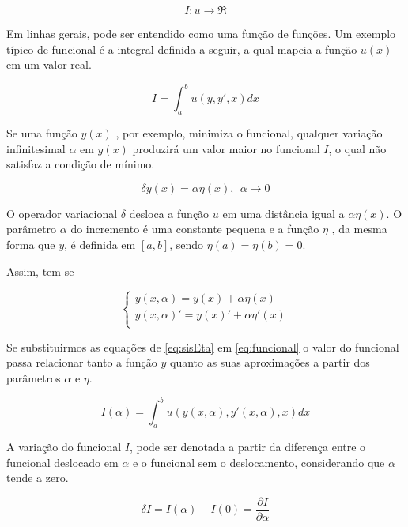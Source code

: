 \begin{equation}
I : u \rightarrow \Re
\end{equation}

Em linhas gerais, pode ser entendido como uma função de funções. Um exemplo típico de funcional é a integral definida a seguir, a qual mapeia a função $ u(x) $ em um valor real.

\begin{equation}
\label{eq:funcional}
I = \int_{a}^{b} u(y, y', x) dx
\end{equation}

Se uma função $ y(x) $ , por exemplo, minimiza o funcional, qualquer variação infinitesimal $ \alpha $ em $ y(x) $ produzirá um valor maior no funcional $ I $, o qual não satisfaz a condição de mínimo.

\begin{equation}
\delta y(x) = \alpha \eta(x), \ \  \alpha \rightarrow 0
\end{equation}

O operador variacional $ \delta $ desloca a função $ u $ em uma distância igual a $ \alpha \eta(x) $. O parâmetro $ \alpha $ do incremento é uma constante pequena e a função $ \eta $ , da mesma forma que $ y $, é definida em $[a,b]$, sendo $\eta(a) = \eta(b) = 0$.

Assim, tem-se 

\begin{equation}
	\label{eq:sisEta}
	\begin{cases}
        y(x, \alpha) = y(x) + \alpha \eta(x) \\
        y(x, \alpha)' = y(x)' + \alpha \eta'(x) \\
    \end{cases}
\end{equation}

Se substituirmos as equações de \ref{eq:sisEta} em \ref{eq:funcional} o valor do funcional passa relacionar tanto a função $ y $ quanto as suas aproximações a partir dos parâmetros $ \alpha $ e $ \eta $.

\begin{equation}
\label{eq:funcionalVar}
I(\alpha) = \int_{a}^{b} u(y(x, \alpha), y'(x, \alpha), x) dx
\end{equation}

A variação do funcional $ I $, pode ser denotada a partir da diferença entre o funcional deslocado em $ \alpha $ e o funcional sem o deslocamento, considerando que $\alpha $ tende a zero.

\begin{equation}
\delta I = I(\alpha) - I(0) = \frac{\partial I}{\partial \alpha}
\end{equation}


